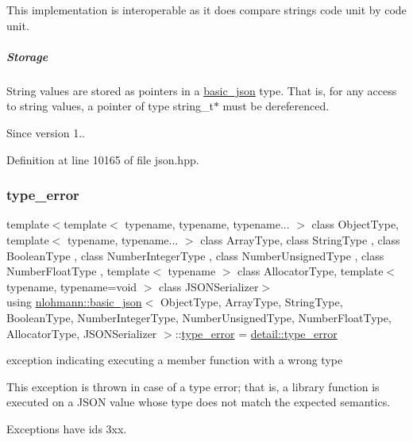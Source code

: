 This implementation is interoperable as it does compare strings code unit by code unit.

\subparagraph*{Storage}

String values are stored as pointers in a \hyperlink{classnlohmann_1_1basic__json}{basic\+\_\+json} type. That is, for any access to string values, a pointer of type {\ttfamily string\+\_\+t$\ast$} must be dereferenced.

\begin{DoxySince}{Since}
version 1.. 
\end{DoxySince}


Definition at line 10165 of file json.\+hpp.

\mbox{\label{classnlohmann_1_1basic__json_a4010e8e268fefd86da773c10318f2902}} 
\subsubsection{\texorpdfstring{type\+\_\+error}{type\_error}}
{\footnotesize\ttfamily template$<$template$<$ typename, typename, typename... $>$ class Object\+Type, template$<$ typename, typename... $>$ class Array\+Type, class String\+Type , class Boolean\+Type , class Number\+Integer\+Type , class Number\+Unsigned\+Type , class Number\+Float\+Type , template$<$ typename $>$ class Allocator\+Type, template$<$ typename, typename=void $>$ class J\+S\+O\+N\+Serializer$>$ \\
using \hyperlink{classnlohmann_1_1basic__json}{nlohmann\+::basic\+\_\+json}$<$ Object\+Type, Array\+Type, String\+Type, Boolean\+Type, Number\+Integer\+Type, Number\+Unsigned\+Type, Number\+Float\+Type, Allocator\+Type, J\+S\+O\+N\+Serializer $>$\+::\hyperlink{classnlohmann_1_1basic__json_a4010e8e268fefd86da773c10318f2902}{type\+\_\+error} =  \hyperlink{classnlohmann_1_1detail_1_1type__error}{detail\+::type\+\_\+error}}



exception indicating executing a member function with a wrong type 

This exception is thrown in case of a type error; that is, a library function is executed on a J\+S\+ON value whose type does not match the expected semantics.

Exceptions have ids 3xx.

